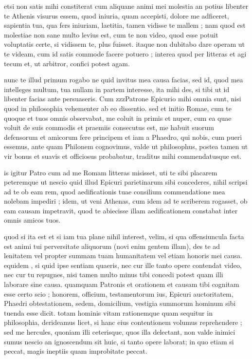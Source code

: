 


 etsi non satis mihi constiterat cum aliquane animi mei molestia an potius libenter te Athenis visurus essem, quod iniuria, quam accepisti, dolore me adficeret, sapientia tua, qua fers iniuriam, laetitia, tamen vidisse te mallem ; nam quod est molestiae non sane multo levius est, cum te non video, quod esse potuit voluptatis certe, si vidissem te, plus fuisset. itaque non dubitabo dare operam ut te videam, cum id satis commode facere potuero ; interea quod per litteras et agi tecum et, ut arbitror, confici potest agam.

 nunc te illud primum rogabo ne quid invitus mea causa facias, sed id, quod mea intelleges multum, tua nullam in partem interesse, ita mihi des, si tibi ut id libenter facias ante persuaseris. Cum zzzPatrone Epicurio mihi omnia sunt, nisi quod in philosophia vehementer ab eo dissentio. sed et initio Romae, cum te quoque et tuos omnis observabat, me coluit in primis et nuper, cum ea quae voluit de suis commodis et praemiis consecutus est, me habuit suorum defensorum et amicorum fere principem et iam a Phaedro, qui nobis, cum pueri essemus, ante quam Philonem cognovimus, valde ut philosophus, postea tamen ut vir bonus et suavis et officiosus probabatur, traditus mihi commendatusque est.

 is igitur Patro cum ad me Romam litteras misisset, uti te sibi placarem peteremque ut nescio quid illud Epicuri parietinarum sibi concederes, nihil scripsi ad te ob eam rem, quod aedificationis tuae consilium commendatione mea nolebam impediri ; idem, ut veni Athenas, cum idem ad te scriberem rogasset, ob eam causam impetravit, quod te abiecisse illam aedificationem constabat inter omnis amicos tuos.

 quod si ita est et si iam tua plane nihil interest, velim, si qua offensiuncula facta est animi tui perversitate aliquorum (novi enim gentem illam), des te ad lenitatem vel propter summam tuam humanitatem vel etiam honoris mei causa. equidem , si quid ipse sentiam quaeris, nec cur ille tanto opere contendat video, nec cur tu repugnes, nisi tamen multo minus tibi concedi potest quam illi laborare sine causa. quamquam Patronis et orationem et causam tibi cognitam esse certo scio ; honorem, officium, testamentorum ius, Epicuri auctoritatem, Phaedri obtestationem, sedem, domicilium, vestigia summorum hominum sibi tuenda esse dicit. totam hominis vitam rationemque quam sequitur in philosophia, derideamus licet, si hanc eius contentionem volumus reprehendere ; sed me hercules, quoniam illi ceterisque, quos illa delectant, non valde inimici sumus nescio an ignoscendum sit huic, si tanto opere laborat; in quo etiam si peccat, magis ineptiis quam improbitate peccat.

